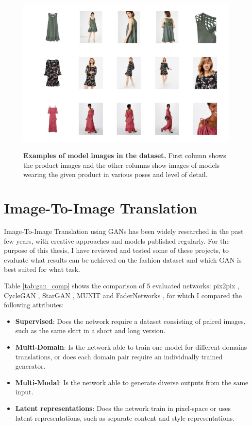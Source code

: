 \documentclass[12pt]{report}
\begin{document}
\begin{figure}[h]
\centering
{\includegraphics[width=\linewidth]{03_analysis/data/model_images}}
\caption{\label{fig:models} \textbf{Examples of model images in the dataset.} First column shows the product images and the other columns show images of models wearing the given product in various poses and level of detail.}
\end{figure}

\pagebreak
\section{Image-To-Image Translation}
Image-To-Image Translation using GANs has been widely researched in the past few years, with creative approaches and models published regularly. For the purpose of this thesis, I have reviewed and tested some of these projects, to evaluate what results can be achieved on the fashion dataset and which GAN is best suited for what task.

Table \ref{tab:gan_comp} shows the comparison of 5 evaluated networks: pix2pix \cite{isola_image--image_2016}, CycleGAN \cite{zhu_unpaired_2017}, StarGAN \cite{choi_stargan_2017}, MUNIT \cite{huang_multimodal_2018} and FaderNetworks \cite{lample_fader_2017}, for which I compared the following attributes:
\begin{itemize}
\item \textbf{Supervised}: Does the network require a dataset consisting of paired images, such as the same skirt in a short and long version.
\item \textbf{Multi-Domain}: Is the network able to train one model for different domains translations, or does each domain pair require an individually trained generator.
\item \textbf{Multi-Modal}: Is the network able to generate diverse outputs from the same input.
\item \textbf{Latent representations}: Does the network train in pixel-space or uses latent representations, such as separate content and style representations.
\end{itemize}
\end{document}
